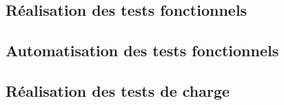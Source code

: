 \subsection{Réalisation des tests fonctionnels}
	

\subsection{Automatisation des tests fonctionnels}
	
	
\subsection{Réalisation des tests de charge}
	
